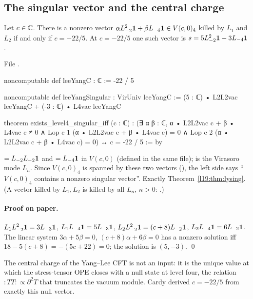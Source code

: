 \subsection{The singular vector and the central charge}

\begin{theorem}\label{l19:thm:lysing}
Let $c\in{\mathbb{C}}$. There is a nonzero vector $\alpha L_{-2}^2\mathbf{1} + \beta L_{-4}\mathbf{1}\in V(c,0)_4$ killed
by $L_1$ and $L_2$ if and only if $c = -22/5$. At $c=-22/5$ one such vector is
$s = 5L_{-2}^2\mathbf{1} - 3L_{-4}\mathbf{1}$.
\end{theorem}

\noindent File .
\begin{leancode}
noncomputable def leeYangC : ℂ := -22 / 5

noncomputable def leeYangSingular : VirUniv leeYangC :=
  (5 : ℂ) • L2L2vac leeYangC + (-3 : ℂ) • L4vac leeYangC

theorem exists_level4_singular_iff (c : ℂ) :
    (∃ α β : ℂ, α • L2L2vac c + β • L4vac c ≠ 0
        ∧ Lop c 1 (α • L2L2vac c + β • L4vac c) = 0
        ∧ Lop c 2 (α • L2L2vac c + β • L4vac c) = 0)
      ↔ c = -22 / 5 := by
\end{leancode}

\begin{dictionary}
 $= L_{-2}L_{-2}\mathbf{1}$ and  $= L_{-4}\mathbf{1}$ in $V(c,0)$
(defined in the same file);  is the Virasoro mode $L_n$. Since $V(c,0)_4$ is spanned by
these two vectors (), the left side says ``$V(c,0)_4$ contains a nonzero singular
vector''. Exactly Theorem~\ref{l19:thm:lysing}. (A vector killed by $L_1,L_2$ is killed by all $L_n$,
$n>0$: .)
\end{dictionary}

\paragraph{Proof on paper.} $L_1L_{-2}^2\mathbf{1} = 3L_{-3}\mathbf{1}$, $L_1L_{-4}\mathbf{1} = 5L_{-3}\mathbf{1}$,
$L_2L_{-2}^2\mathbf{1} = (c+8)L_{-2}\mathbf{1}$, $L_2L_{-4}\mathbf{1} = 6L_{-2}\mathbf{1}$. The linear system
$3\alpha+5\beta = 0$, $(c+8)\alpha+6\beta = 0$ has a nonzero solution iff $18-5(c+8) = -(5c+22) = 0$;
the solution is $(5,-3)$. \qed

\begin{physics}
The central charge of the Yang--Lee CFT is not an input: it is the unique value at which the
stress-tensor OPE closes with a null state at level four, the relation $:TT: \propto \partial^2T$ that
truncates the vacuum module. Cardy derived $c = -22/5$ from exactly this null vector.
\end{physics}

